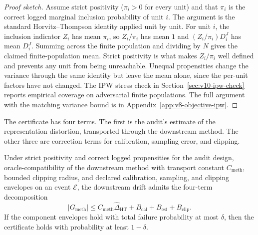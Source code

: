 \begin{proof}[Proof sketch]
Assume strict positivity (\(\pi_i>0\) for every unit) and that
\(\pi_i\) is the correct logged marginal inclusion probability of
unit \(i\). The argument is the standard Horvitz--Thompson identity
applied unit by unit. For unit \(i\), the inclusion indicator
\(Z_i\) has mean \(\pi_i\), so \(Z_i/\pi_i\) has mean \(1\) and
\((Z_i/\pi_i)D_i^J\) has mean \(D_i^J\). Summing across the finite
population and dividing by \(N\) gives the claimed finite-population
mean. Strict positivity is what makes \(Z_i/\pi_i\) well defined and
prevents any unit from being unreachable. Unequal propensities
change the variance through the same identity but leave the mean
alone, since the per-unit factors have not changed. The IPW stress
check in Section~\ref{sec:v10-ipw-check} reports empirical coverage
on adversarial finite populations. The full argument with the
matching variance bound is in Appendix~\ref{app:v8-objective-ipw}.
\end{proof}

The certificate has four terms. The first is the audit's estimate of
the representation distortion, transported through the downstream
method. The other three are correction terms for calibration,
sampling error, and clipping.

\begin{proposition}
\label{prop:v10-finite-sample-certificate}
Under strict positivity and correct logged propensities for the
audit design, oracle-compatibility of the downstream method with
transport constant \(C_{\mathrm{meth}}\), bounded clipping radius,
and declared calibration, sampling, and clipping envelopes on an
event \(\mathcal E\), the downstream drift admits the four-term
decomposition
\begin{equation}
\label{eq:v8-finite-sample-certificate}
  |G_{\mathrm{meth}}|
  \le
  C_{\mathrm{meth}}\widehat{\Delta}_{\mathrm{HT}}
  +
  B_{\mathrm{cal}}
  +
  B_{\mathrm{est}}
  +
  B_{\mathrm{clip}} .
\end{equation}
If the component envelopes hold with total failure probability at
most \(\delta\), then the certificate holds with probability at least
\(1-\delta\).
\end{proposition}

